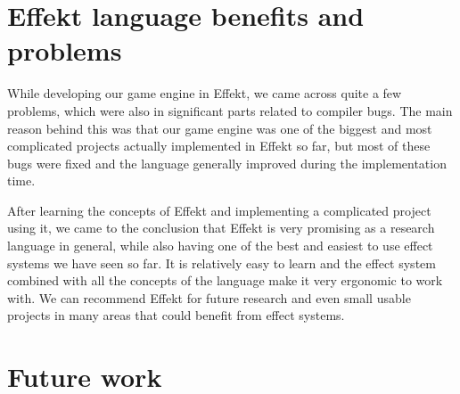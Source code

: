 \section*{Effekt language benefits and problems}

While developing our game engine in Effekt, we came across quite a few problems, which were also in significant parts related to compiler bugs. The main reason behind this was that our game engine was one of the biggest and most complicated projects actually implemented in Effekt so far, but most of these bugs were fixed and the language generally improved during the implementation time.

After learning the concepts of Effekt and implementing a complicated project using it, we came to the conclusion that Effekt is very promising as a research language in general, while also having one of the best and easiest to use effect systems we have seen so far. It is relatively easy to learn and the effect system combined with all the concepts of the language make it very ergonomic to work with. We can recommend Effekt for future research and even small usable projects in many areas that could benefit from effect systems.

\section*{Future work}

